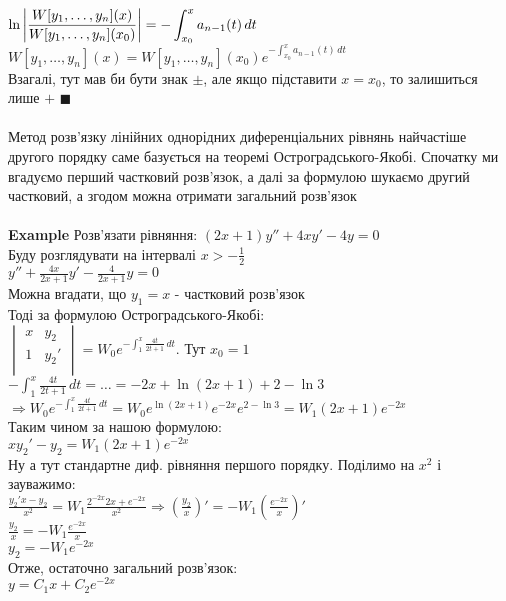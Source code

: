 \documentclass[a4paper, 14pt]{extarticle}
\def\huge{\displaystyle}
\def\bigline{\vspace{5mm}\\}
\def\qed{$\blacksquare$}
\begin{document}
$\huge \ln \abs{\frac{W[y_1, \dots, y_n](x)}{W[y_1, \dots, y_n](x_0)}} = - \int_{x_0}^x a_{n-1}(t)\,dt$\\
$\huge W[y_1, \dots, y_n](x) = W[y_1, \dots, y_n](x_0)e^{\huge -\int_{x_0}^x a_{n-1}(t)\,dt}$\\
Взагалі, тут мав би бути знак $\pm$, але якщо підставити $x=x_0$, то залишиться лише $ +$ \qed
\\
\bigline
Метод розв'язку лінійних однорідних диференціальних рівнянь найчастіше другого порядку саме базується на теоремі Остроградського-Якобі. Спочатку ми вгадуємо перший частковий розв'язок, а далі за формулою шукаємо другий частковий, а згодом можна отримати загальний розв'язок
\\
\\
\textbf{Example} Розв'язати рівняння: $(2x+1)y'' + 4xy' - 4y = 0$\\
Буду розглядувати на інтервалі $\huge x>-\frac{1}{2}$\\
$\huge y'' + \frac{4x}{2x+1}y' - \frac{4}{2x+1}y = 0$\\
Можна вгадати, що $y_1 = x$ - частковий розв'язок\\
Тоді за формулою Остроградського-Якобі:\\
$\huge \begin{vmatrix}
x & y_2 \\
1 & y_2' \\
\end{vmatrix}
= W_0 e^{-\int_{1}^x \frac{4t}{2t+1}\,dt}$. Тут $x_0 = 1$\\
$\huge -\int_{1}^x \frac{4t}{2t+1}\,dt = \dots = -2x + \ln(2x+1) + 2 - \ln3$\\
$\Rightarrow W_0 e^{-\int_{1}^x \frac{4t}{2t+1}\,dt} = W_0 e^{\ln(2x+1)} e^{-2x} e^{2 - \ln3} = W_1(2x+1)e^{-2x}$\\
Таким чином за нашою формулою:\\
$xy_2'-y_2=W_1(2x+1)e^{-2x}$\\
Ну а тут стандартне диф. рівняння першого порядку. Поділимо на $x^2$ і зауважимо:\\
$\huge \frac{y_2'x-y_2}{x^2} = W_1 \frac{2^{-2x}2x + e^{-2x}}{x^2} \Rightarrow \left(\frac{y_2}{x}\right)' = -W_1 \left( \frac{e^{-2x}}{x} \right)'$\\
$\huge \frac{y_2}{x} = -W_1 \frac{e^{-2x}}{x}$\\
$y_2 = -W_1e^{-2x}$\\
Отже, остаточно загальний розв'язок:\\
$y = C_1x + C_2e^{-2x}$
\bigline
\end{document}
